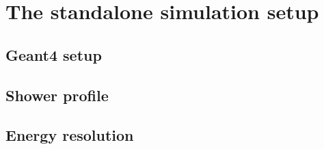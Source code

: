 \section{The standalone simulation setup}
\label{sec:standalone}

\subsection{Geant4 setup}

\subsection{Shower profile}

\subsection{Energy resolution}